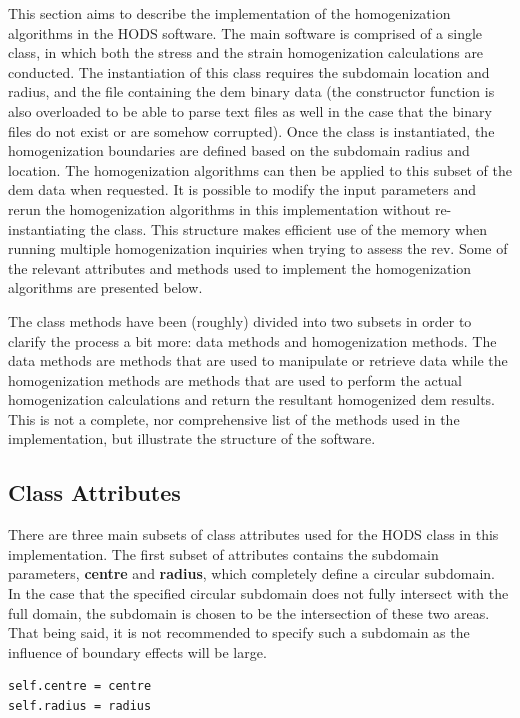 This section aims to describe the implementation of the homogenization algorithms in the HODS software. The main software is comprised of a single class, in which both the stress and the strain homogenization calculations are conducted. The instantiation of this class requires the subdomain location and radius, and the file containing the \acrshort{dem} binary data (the constructor function is also overloaded to be able to parse text files as well in the case that the binary files do not exist or are somehow corrupted). Once the class is instantiated, the homogenization boundaries are defined based on the subdomain radius and location. The homogenization algorithms can then be applied to this subset of the \acrshort{dem} data when requested. It is possible to modify the input parameters and rerun the homogenization algorithms in this implementation without re-instantiating the class. This structure makes efficient use of the memory when running multiple homogenization inquiries when trying to assess the \acrshort{rev}. Some of the relevant attributes and methods used to implement the homogenization algorithms are presented below. 

The class methods have been (roughly) divided into two subsets in order to clarify the process a bit more: data methods and homogenization methods. The data methods are methods that are used to manipulate or retrieve data while the homogenization methods are methods that are used to perform the actual homogenization calculations and return the resultant homogenized \acrshort{dem} results. This is not a complete, nor comprehensive list of the methods used in the implementation, but illustrate the structure of the software.

\subsection{Class Attributes}

There are three main subsets of class attributes used for the HODS class in this implementation. The first subset of attributes contains the subdomain parameters, \textbf{centre} and \textbf{radius}, which completely define a circular subdomain. In the case that the specified circular subdomain does not fully intersect with the full domain, the subdomain is chosen to be the intersection of these two areas. That being said, it is not recommended to specify such a subdomain as the influence of boundary effects will be large.

\begin{lstlisting}[frame=single] 
self.centre = centre
self.radius = radius
\end{lstlisting}

